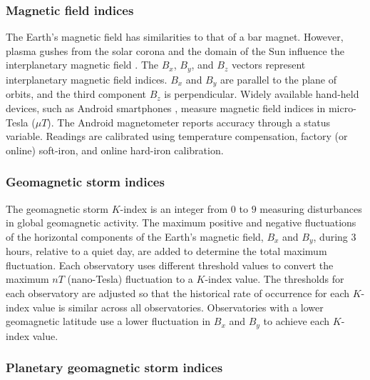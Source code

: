 \let\LaTeXcline\cline\documentclass[sn-mathphys-num]{sn-jnl}\let\cline\LaTeXcline
\begin{document}
\subsubsection{Magnetic field indices}

The Earth's magnetic field has similarities to that of a bar magnet. However, plasma gushes from the solar corona and the domain of the Sun influence the interplanetary magnetic field \cite{schwenn2001solar}. The $B_{x}$, $B_{y}$, and $B_{z}$ vectors represent interplanetary magnetic field indices. $B_{x}$ and $B_{y}$ are parallel to the plane of orbits, and the third component $B_{z}$ is perpendicular. Widely available hand-held devices, such as Android smartphones \cite{Bojinov2014}, measure magnetic field indices in micro-Tesla ($\mu T$). The Android magnetometer reports accuracy through a status variable. Readings are calibrated using temperature compensation, factory (or online) soft-iron, and online hard-iron calibration.
 
\subsubsection{Geomagnetic storm indices}

The geomagnetic storm $K$-index is an integer from $0$ to $9$ measuring disturbances in global geomagnetic activity. The maximum positive and negative fluctuations of the horizontal components of the Earth's magnetic field, $B_{x}$ and $B_{y}$, during $3$ hours, relative to a quiet day, are added to determine the total maximum fluctuation. Each observatory uses different threshold values to convert the maximum $nT$ (nano-Tesla) fluctuation to a $K$-index value. The thresholds for each observatory are adjusted so that the historical rate of occurrence for each $K$-index value is similar across all observatories. Observatories with a lower geomagnetic latitude use a lower fluctuation in $B_{x}$ and $B_{y}$ to achieve each $K$-index value.

\subsubsection{Planetary geomagnetic storm indices}
\end{document}
